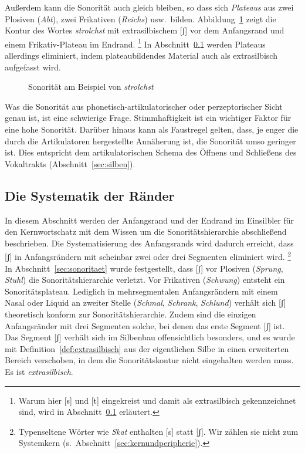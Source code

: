 Außerdem kann die Sonorität auch gleich bleiben, so dass sich \textit{Plateaus} aus zwei Plosiven (\textit{Abt}), zwei Frikativen (\textit{Reichs}) usw.\ bilden.
Abbildung~\ref{fig:sonoritaet102} zeigt die Kontur des Wortes \textit{strolchst} mit extrasilbischem [ʃ] vor dem Anfangsrand und einem Frikativ-Plateau im Endrand.%
\footnote{Warum hier [s] und [t] eingekreist und damit als extrasilbisch gekennzeichnet sind, wird in Abschnitt~\ref{sec:diesystematikderraender} erläutert.}
In Abschnitt~\ref{sec:diesystematikderraender} werden Plateaus allerdings eliminiert, indem plateaubildendes Material auch als extrasilbisch aufgefasst wird.

\begin{figure}[!htbp]
  \centering
  \caption{Sonorität am Beispiel von \textit{strolchst}}
  \label{fig:sonoritaet102}
\end{figure}

Was die Sonorität aus phonetisch-artikulatorischer oder perzeptorischer Sicht genau ist, ist eine schwierige Frage.
Stimmhaftigkeit ist ein wichtiger Faktor für eine hohe Sonorität.
Darüber hinaus kann als Faustregel gelten, dass, je enger die durch die Artikulatoren hergestellte Annäherung ist, die Sonorität umso geringer ist.
Dies entspricht dem artikulatorischen Schema des Öffnens und Schließens des Vokaltrakts (Abschnitt~\ref{sec:silben}).

\subsection{Die Systematik der Ränder}
\label{sec:diesystematikderraender}


In diesem Abschnitt werden der Anfangsrand und der Endrand im Einsilbler für den Kernwortschatz mit dem Wissen um die Sonoritätshierarchie abschließend beschrieben.
Die Systematisierung des Anfangsrands wird dadurch erreicht, dass [ʃ] in Anfangsrändern mit scheinbar zwei oder drei Segmenten eliminiert wird.%
\footnote{Typenseltene Wörter wie \textit{Skat} enthalten [s] statt [ʃ].
Wir zählen sie nicht zum Systemkern (s.\ Abschnitt~\ref{sec:kernundperipherie}).}
In Abschnitt~\ref{sec:sonoritaet} wurde festgestellt, dass [ʃ] vor Plosiven (\textit{Sprung}, \textit{Stuhl}) die Sonoritätshierarchie verletzt.
Vor Frikativen (\textit{Schwung}) entsteht ein Sonoritätsplateau.
Lediglich in mehrsegmentalen Anfangsrändern mit einem Nasal oder Liquid an zweiter Stelle (\textit{Schmal}, \textit{Schrank}, \textit{Schlund}) verhält sich [ʃ] theoretisch konform zur Sonoritätshierarchie.
Zudem sind die einzigen Anfangsränder mit drei Segmenten solche, bei denen das erste Segment [ʃ] ist.
Das Segment [ʃ] verhält sich im Silbenbau offensichtlich besonders, und es wurde mit Definition~\ref{def:extrasilbisch} aus der eigentlichen Silbe in einen erweiterten Bereich verschoben, in dem die Sonoritätskontur nicht eingehalten werden muss.
Es ist \textit{extrasilbisch}.

